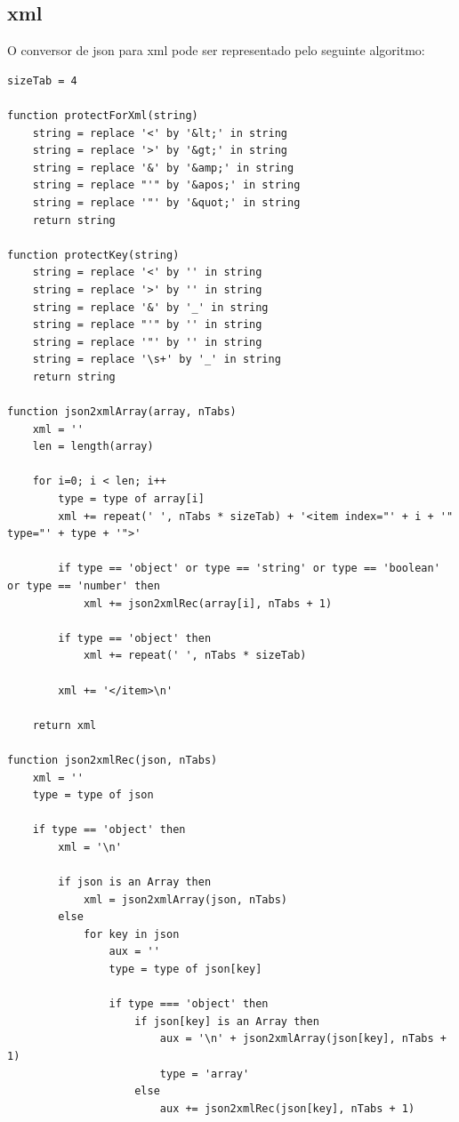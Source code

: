 \subsection{\acrshort{xml}}
O conversor de \acrshort{json} para \acrshort{xml} pode ser representado pelo seguinte algoritmo:
\begin{lstlisting}[language=pseudocode, caption=Algorítmo de conversão de \acrshort{json} para \acrshort{xml}]
sizeTab = 4

function protectForXml(string)
    string = replace '<' by '&lt;' in string
    string = replace '>' by '&gt;' in string
    string = replace '&' by '&amp;' in string
    string = replace "'" by '&apos;' in string
    string = replace '"' by '&quot;' in string
    return string

function protectKey(string)
    string = replace '<' by '' in string
    string = replace '>' by '' in string
    string = replace '&' by '_' in string
    string = replace "'" by '' in string
    string = replace '"' by '' in string
    string = replace '\s+' by '_' in string
    return string

function json2xmlArray(array, nTabs)
    xml = ''
    len = length(array)

    for i=0; i < len; i++
        type = type of array[i]
        xml += repeat(' ', nTabs * sizeTab) + '<item index="' + i + '" type="' + type + '">' 

        if type == 'object' or type == 'string' or type == 'boolean' or type == 'number' then
            xml += json2xmlRec(array[i], nTabs + 1)

        if type == 'object' then
            xml += repeat(' ', nTabs * sizeTab)

        xml += '</item>\n'

    return xml

function json2xmlRec(json, nTabs)
    xml = ''
    type = type of json
    
    if type == 'object' then
        xml = '\n'

        if json is an Array then
            xml = json2xmlArray(json, nTabs)
        else
            for key in json
                aux = ''
                type = type of json[key]

                if type === 'object' then
                    if json[key] is an Array then
                        aux = '\n' + json2xmlArray(json[key], nTabs + 1)
                        type = 'array'
                    else
                        aux += json2xmlRec(json[key], nTabs + 1)
                    

\end{lstlisting}
